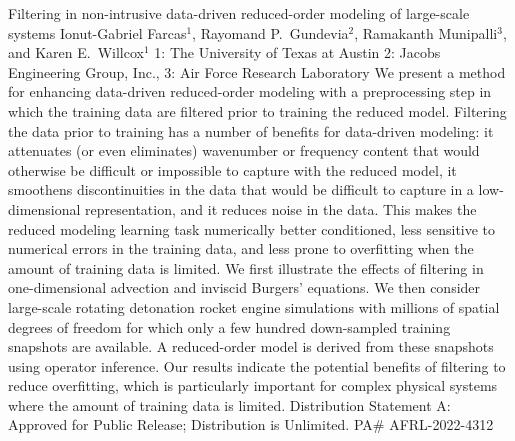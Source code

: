\begin{addmargin}[2em]{0em}
\vspace{1.5ex}
\abs
{Filtering in non-intrusive data-driven reduced-order modeling of large-scale systems}
{Ionut-Gabriel Farcas$^{1}$, Rayomand P.~Gundevia$^{2}$, Ramakanth Munipalli$^{3}$, and Karen E.~Willcox$^{1}$}
{1: The University of Texas at Austin 2: Jacobs Engineering Group, Inc., 3: Air Force Research Laboratory}
{We present a method for enhancing data-driven reduced-order modeling with a preprocessing step in which the training data are filtered prior to training the reduced model.
Filtering the data prior to training has a number of benefits for data-driven modeling: it attenuates (or even eliminates) wavenumber or frequency content that would otherwise be difficult or impossible to capture with the reduced model, it smoothens discontinuities in the data that would be difficult to capture in a low-dimensional representation, and it reduces noise in the data.
This makes the reduced modeling learning task numerically better conditioned, less sensitive to numerical errors in the training data, and less prone to overfitting when the amount of training data is limited.
We first illustrate the effects of filtering in one-dimensional advection and inviscid Burgers' equations.
We then consider large-scale rotating detonation rocket engine simulations with millions of spatial degrees of freedom for which only a few hundred down-sampled training snapshots are available.
A reduced-order model is derived from these snapshots using operator inference.
Our results indicate the potential benefits of filtering to reduce overfitting, which is particularly important for complex physical systems where the amount of training data is limited.
\newline
\noindent Distribution Statement A: Approved for Public Release; Distribution is Unlimited. PA$\#$ AFRL-2022-4312
}



\end{addmargin}
